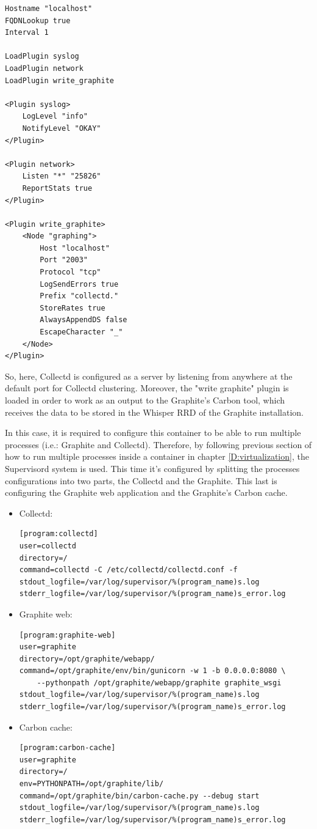 \begin{verbatim}
Hostname "localhost"
FQDNLookup true
Interval 1

LoadPlugin syslog
LoadPlugin network
LoadPlugin write_graphite

<Plugin syslog>
	LogLevel "info"
	NotifyLevel "OKAY"
</Plugin>

<Plugin network>
	Listen "*" "25826"
	ReportStats true
</Plugin>

<Plugin write_graphite>
	<Node "graphing">
		Host "localhost"
		Port "2003"
		Protocol "tcp"
		LogSendErrors true
		Prefix "collectd."
		StoreRates true
		AlwaysAppendDS false
		EscapeCharacter "_"
	</Node>
</Plugin>
\end{verbatim}

So, here, Collectd is configured as a server by listening from anywhere at the default port for Collectd clustering. Moreover, the "write graphite" plugin is loaded in order to work as an output to the Graphite's Carbon tool, which receives the data to be stored in the Whisper RRD of the Graphite installation.

In this case, it is required to configure this container to be able to run multiple processes (i.e.: Graphite and Collectd). Therefore, by following previous section of how to run multiple processes inside a container in chapter \ref{D:virtualization}, the Supervisord system is used. This time it's configured by splitting the processes configurations into two parts, the Collectd and the Graphite. This last is configuring the Graphite web application and the Graphite's Carbon cache.

\begin{itemize}
\item Collectd: \hfill

\begin{verbatim}
[program:collectd]
user=collectd
directory=/
command=collectd -C /etc/collectd/collectd.conf -f
stdout_logfile=/var/log/supervisor/%(program_name)s.log
stderr_logfile=/var/log/supervisor/%(program_name)s_error.log
\end{verbatim}
\item Graphite web: \hfill

\begin{verbatim}
[program:graphite-web]
user=graphite
directory=/opt/graphite/webapp/
command=/opt/graphite/env/bin/gunicorn -w 1 -b 0.0.0.0:8080 \
	--pythonpath /opt/graphite/webapp/graphite graphite_wsgi
stdout_logfile=/var/log/supervisor/%(program_name)s.log
stderr_logfile=/var/log/supervisor/%(program_name)s_error.log
\end{verbatim}

\item Carbon cache: \hfill

\begin{verbatim}
[program:carbon-cache]
user=graphite
directory=/
env=PYTHONPATH=/opt/graphite/lib/
command=/opt/graphite/bin/carbon-cache.py --debug start
stdout_logfile=/var/log/supervisor/%(program_name)s.log
stderr_logfile=/var/log/supervisor/%(program_name)s_error.log
\end{verbatim}
\end{itemize}

